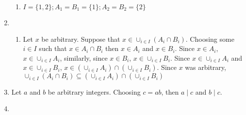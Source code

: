 \begin{enumerate}
\begin{enumerate}
        \item 
    $I=\{1,2\}; A_1 = B_1 = \{1\}; A_2 = B_2 = \{2\}$
    \end{enumerate}
    \item
    \begin{enumerate}
        \item 
    Let $x$ be arbitrary. Suppose that $x \in \cup_{i \in I}(A_i \cap B_i)$. Choosing some $i \in I$ such that $x \in A_i \cap B_i$ then $x \in A_i$ and $x \in B_i$. Since $x \in A_i$, $x \in \cup_{i \in I} A_i$, similarly, since $x \in B_i$, $x \in \cup_{i \in I} B_i$. Since $x \in \cup_{i \in I} A_i$ and $x \in \cup_{i \in I} B_i$, $x \in (\cup_{i \in I} A_i) \cap (\cup_{i \in I} B_i)$. Since $x$ was arbitrary, $\cup_{i \in I}(A_i \cap B_i) \subseteq (\cup_{i \in I} A_i) \cap (\cup_{i \in I} B_i)$
    \end{enumerate}
    \item
    Let $a$ and $b$ be arbitrary integers. Choosing $c = ab$, then $a \mid c$ and $b \mid c$.
    \item
    
\end{enumerate}
